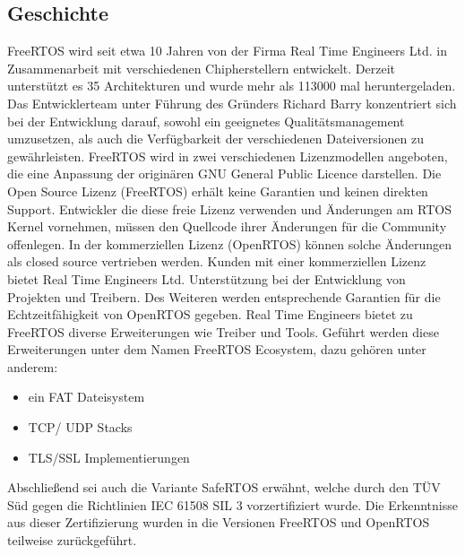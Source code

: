 \subsection{Geschichte}
FreeRTOS wird seit etwa 10 Jahren von der Firma Real Time Engineers Ltd. in Zusammenarbeit mit verschiedenen Chipherstellern entwickelt. Derzeit unterstützt es 35 Architekturen und wurde mehr als 113000 mal heruntergeladen. Das Entwicklerteam unter Führung des Gründers Richard Barry konzentriert sich bei der Entwicklung darauf, sowohl ein geeignetes Qualitätsmanagement umzusetzen, als auch die Verfügbarkeit der verschiedenen Dateiversionen zu gewährleisten. FreeRTOS wird in zwei verschiedenen Lizenzmodellen angeboten, die eine Anpassung der originären GNU General Public Licence darstellen. Die Open Source Lizenz (FreeRTOS) erhält keine Garantien und keinen direkten Support. Entwickler die diese freie Lizenz verwenden und Än\-der\-ungen am RTOS Kernel vornehmen, müssen den Quellcode ihrer Än\-der\-ungen für die Community offenlegen. In der kommerziellen Lizenz \newline (OpenRTOS) können solche Änderungen als closed source vertrieben werden. Kunden mit einer kommerziellen Lizenz bietet Real Time Engineers Ltd. Unterstützung bei der Entwicklung von Projekten und Treibern. Des Weiteren werden entsprechende Garantien für die Echt\-zeit\-fähig\-keit von OpenRTOS gegeben. Real Time Engineers bietet zu FreeRTOS diverse Erweiterungen wie Treiber und Tools. Ge\-führt werden diese Erweiterungen unter dem Namen FreeRTOS Ecosystem, dazu gehören unter anderem:
\begin{itemize}
	\item ein FAT Dateisystem
	\item TCP/ UDP Stacks
	\item TLS/SSL Implementierungen
\end{itemize}
Abschließend sei auch die Variante SafeRTOS erwähnt, welche durch den TÜV Süd gegen die Richtlinien IEC 61508 SIL 3 vorzertifiziert wurde. Die Erkenntnisse aus dieser Zertifizierung wurden in die Versionen FreeRTOS und OpenRTOS teilweise zurückgeführt.
